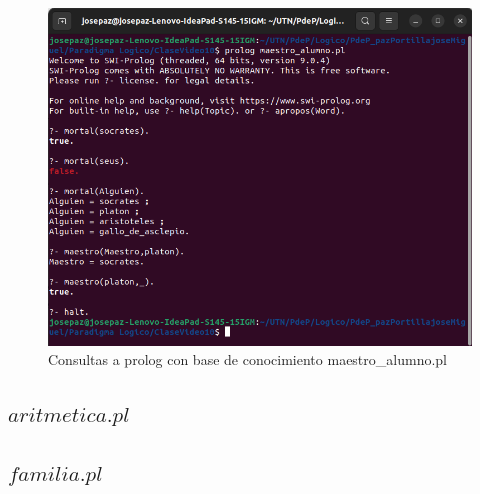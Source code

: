 \documentclass[11pt,a4paper]{article}
\begin{document}
\begin{figure}[H]
	\centering
	\includegraphics[scale=0.6]{figuras/maestro_alumno.png}
    \caption{Consultas a prolog con base de conocimiento maestro\_alumno.pl}
    \label{fig:maestro alumno}
\end{figure} 


\subsection{$aritmetica.pl$}
 

\subsection{$familia.pl$}
 
\newpage

\appendix

%
%
%
\end{document}
